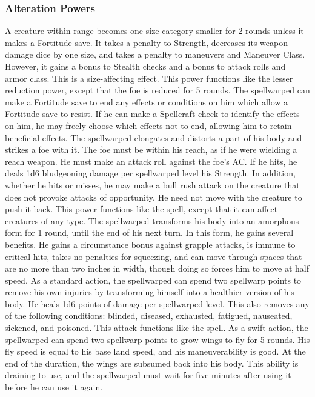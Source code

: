 \subsubsection{Alteration Powers}
 A creature within \rngclose range becomes one size category smaller for 2 rounds unless it makes a Fortitude save. It takes a  penalty to Strength, decreases its weapon damage dice by one size, and takes a  penalty to maneuvers and Maneuver Class. However, it gains a  bonus to Stealth checks and a  bonus to attack rolls and armor class. This is a size-affecting effect.
 This power functions like the lesser reduction power, except that the foe is reduced for 5 rounds.
 The spellwarped can make a Fortitude save to end any effects or conditions on him which allow a Fortitude save to resist. If he can make a Spellcraft check to identify the effects on him, he may freely choose which effects not to end, allowing him to retain beneficial effects.
 The spellwarped elongates and distorts a part of his body and strikes a foe with it. The foe must be within his reach, as if he were wielding a reach weapon. He must make an attack roll against the foe's AC. If he hits, he deals 1d6 bludgeoning damage per spellwarped level \add his Strength. In addition, whether he hits or misses, he may make a bull rush attack on the creature that does not provoke attacks of opportunity. He need not move with the creature to push it back.
 This power functions like the  spell, except that it can affect creatures of any type.
 The spellwarped transforms his body into an amorphous form for 1 round, until the end of his next turn. In this form, he gains several benefits. He gains a  circumstance bonus against grapple attacks, is immune to critical hits, takes no penalties for squeezing, and can move through spaces that are no more than two inches in width, though doing so forces him to move at half speed.
 As a standard action, the spellwarped can spend two spellwarp points to remove his own injuries by transforming himself into a healthier version of his body. He heals 1d6 points of damage per spellwarped level. This also removes any of the following conditions: blinded, diseased, exhausted, fatigued, nauseated, sickened, and poisoned.
 This attack functions like the  spell.
 As a swift action, the spellwarped can spend two spellwarp points to grow wings to fly for 5 rounds. His fly speed is equal to his base land speed, and his maneuverability is good. At the end of the duration, the wings are subsumed back into his body. This ability is draining to use, and the spellwarped must wait for five minutes after using it before he can use it again.
